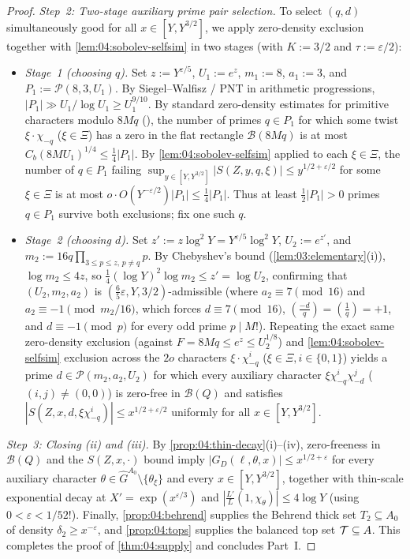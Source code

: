 \begin{proof}
\emph{Step~2: Two-stage auxiliary prime pair selection.}
To select $(q, d)$ simultaneously good for all $x \in [Y, Y^{3/2}]$, we apply zero-density exclusion together with \cref{lem:04:sobolev-selfsim} in two stages (with $K := 3/2$ and $\tau := \varepsilon/2$):
\begin{itemize}
\item \emph{Stage~1 (choosing $q$).} Set $z := Y^{\varepsilon/5}$, $U_1 := e^z$, $m_1 := 8$, $a_1 := 3$, and $P_1 := \mathcal{P}(8, 3, U_1)$. By Siegel--Walfisz / PNT in arithmetic progressions, $|P_1| \gg U_1 / \log U_1 \ge U_1^{9/10}$. By standard zero-density estimates for primitive characters modulo $8M q$ (), the number of primes $q \in P_1$ for which some twist $\xi \cdot \chi_{-q}$ ($\xi \in \Xi$) has a zero in the flat rectangle $\mathcal{B}(8Mq)$ is at most $C_b (8M U_1)^{1/4} \le \frac{1}{4}|P_1|$. By \cref{lem:04:sobolev-selfsim} applied to each $\xi \in \Xi$, the number of $q \in P_1$ failing $\sup_{y \in [Y, Y^{3/2}]} |S(Z, y, q, \xi)| \le y^{1/2 + \varepsilon/2}$ for some $\xi \in \Xi$ is at most $o \cdot O(Y^{-\varepsilon/2})|P_1| \le \frac{1}{4}|P_1|$. Thus at least $\frac{1}{2}|P_1| > 0$ primes $q \in P_1$ survive both exclusions; fix one such $q$.
\item \emph{Stage~2 (choosing $d$).} Set $z' := z \log^2 Y = Y^{\varepsilon/5}\log^2 Y$, $U_2 := e^{z'}$, and $m_2 := 16 q \prod_{3 \le p \le z,\, p \neq q} p$. By Chebyshev's bound (\cref{lem:03:elementary}(i)), $\log m_2 \le 4z$, so $\frac{1}{4}(\log Y)^2 \log m_2 \le z' = \log U_2$, confirming that $(U_2, m_2, a_2)$ is $(\frac{6}{5}\varepsilon, Y, 3/2)$-admissible (where $a_2 \equiv 7 \pmod{16}$ and $a_2 \equiv -1 \pmod{m_2/16}$, which forces $d \equiv 7 \pmod{16}$, $(\frac{-d}{q}) = (\frac{1}{q}) = +1$, and $d \equiv -1 \pmod{p}$ for every odd prime $p \mid M$!). Repeating the exact same zero-density exclusion (against $F = 8Mq \le e^z \le U_2^{1/8}$) and \cref{lem:04:sobolev-selfsim} exclusion across the $2o$ characters $\xi \cdot \chi_{-q}^i$ ($\xi \in \Xi, i \in \{0, 1\}$) yields a prime $d \in \mathcal{P}(m_2, a_2, U_2)$ for which every auxiliary character $\xi \chi_{-q}^i \chi_{-d}^j$ ($(i, j) \neq (0, 0)$) is zero-free in $\mathcal{B}(Q)$ and satisfies $|S(Z, x, d, \xi\chi_{-q}^i)| \le x^{1/2+\varepsilon/2}$ uniformly for all $x \in [Y, Y^{3/2}]$.
\end{itemize}

\emph{Step~3: Closing (ii) and (iii).}
By \cref{prop:04:thin-decay}(i)--(iv), zero-freeness in $\mathcal{B}(Q)$ and the $S(Z, x, \cdot)$ bound imply $|G_D(\ell, \theta, x)| \le x^{1/2 + \varepsilon}$ for every auxiliary character $\theta \in \widehat{G}^{A_0} \setminus \{\theta_\xi\}$ and every $x \in [Y, Y^{3/2}]$, together with thin-scale exponential decay at $X' = \exp(x^{\varepsilon/3})$ and $|\frac{L'}{L}(1, \chi_\theta)| \le 4\log Y$ (using $0 < \varepsilon < 1/52$!). Finally, \cref{prop:04:behrend} supplies the Behrend thick set $T_2 \subseteq A_0$ of density $\delta_2 \ge x^{-\varepsilon}$, and \cref{prop:04:tops} supplies the balanced top set $\mathcal{T} \subseteq A$. This completes the proof of \cref{thm:04:supply} and concludes Part~I.
\end{proof}
